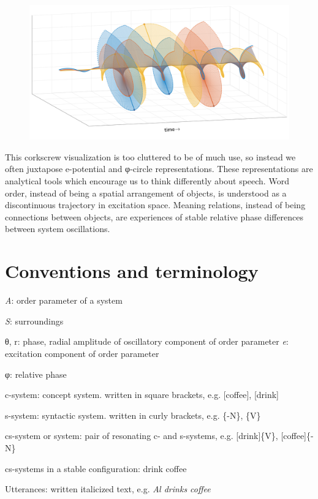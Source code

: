   
\begin{figure}
\includegraphics[width=\textwidth]{figures/Tilsen-img28.png}
\caption{\missingcaption}
\label{fig:}
\end{figure}
 

  This corkscrew visualization is too cluttered to be of much use, so instead we often juxtapose e-potential and φ{}-circle representations. These representations are analytical tools which encourage us to think differently about speech. Word order, instead of being a spatial arrangement of objects, is understood as a discontinuous trajectory in excitation space. Meaning relations, instead of being connections between objects, are experiences of stable relative phase differences between system oscillations.

\section{Conventions and terminology}

\textit{A}: order parameter of a system

\textit{S}: surroundings

θ, r: phase, radial amplitude of oscillatory component of order parameter
\textit{e}: excitation component of order parameter

φ: relative phase

c-system: concept system. written in square brackets, e.g. [coffee], [drink]

s-system: syntactic system. written in curly brackets, e.g. \{-N\}, \{V\}

cs-system or system: pair of resonating c- and s-systems, e.g. [drink]\{V\}, [coffee]\{-N\}

cs-systems in a stable configuration: {\textbar}drink coffee{\textbar}

Utterances: written italicized text, e.g. \textit{Al drinks coffee}

